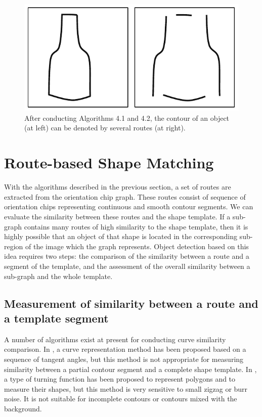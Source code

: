 \documentclass[journal]{IEEEtran}
\begin{document}
\begin{figure}[!t]
\centering
\includegraphics[width=0.4\linewidth]{images/fig11.pdf}
\caption{After conducting Algorithms 4.1 and 4.2, 
the contour of an object (at left) can be denoted by several routes (at right).}
\label{fig:11}
\end{figure}

\section{Route-based Shape Matching}

With the algorithms described in the previous section,
a set of routes are extracted from the orientation chip graph.
These routes consist of sequence of orientation chips representing continuous and smooth contour segments.
We can evaluate the similarity between these routes and the shape template. 
If a sub-graph contains many routes of high similarity to the shape template,
then it is highly possible that an object of that shape is located in the corresponding sub-region of the image which the graph represents. 
Object detection based on this idea requires two steps: 
the comparison of the similarity between a route and a segment of the template, 
and the assessment of the overall similarity between a sub-graph and the whole template.

\subsection{Measurement of similarity between a route and a template segment}

A number of algorithms exist at present for conducting curve similarity comparison. 
In \cite{schindler2008}, a curve representation method has been proposed based on a sequence of tangent angles,
but this method is not appropriate for measuring similarity between a partial contour segment and a complete shape template.
In \cite{arkin1991}, a type of turning function has been proposed to represent polygons and to measure their shapes, 
but this method is very sensitive to small zigzag or burr noise.
It is not suitable for incomplete contours or contours mixed with the background. 
\end{document}
